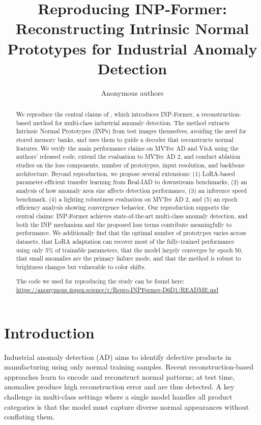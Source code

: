 \documentclass[10pt]{article} %
\title{Reproducing INP-Former: Reconstructing Intrinsic Normal Prototypes for Industrial Anomaly Detection}
\author{\name Anonymous authors}
\begin{document}
\maketitle

\begin{abstract}
We reproduce the central claims of \citet{inp_former_2025}, which introduces INP-Former, a reconstruction-based method for multi-class industrial anomaly detection. The method extracts Intrinsic Normal Prototypes (INPs) from test images themselves, avoiding the need for stored memory banks, and uses them to guide a decoder that reconstructs normal features. We verify the main performance claims on MVTec AD and VisA using the authors' released code, extend the evaluation to MVTec AD 2, and conduct ablation studies on the loss components, number of prototypes, input resolution, and backbone architecture. Beyond reproduction, we propose several extensions: (1) LoRA-based parameter-efficient transfer learning from Real-IAD to downstream benchmarks, (2) an analysis of how anomaly area size affects detection performance, (3) an inference speed benchmark, (4) a lighting robustness evaluation on MVTec AD 2, and (5) an epoch efficiency analysis showing convergence behavior. Our reproduction supports the central claims: INP-Former achieves state-of-the-art multi-class anomaly detection, and both the INP mechanism and the proposed loss terms contribute meaningfully to performance. We additionally find that the optimal number of prototypes varies across datasets, that LoRA adaptation can recover most of the fully-trained performance using only 5\% of trainable parameters, that the model largely converges by epoch 50, that small anomalies are the primary failure mode, and that the method is robust to brightness changes but vulnerable to color shifts.

The code we used for reproducing the study can be found here: \url{https://anonymous.4open.science/r/Repro-INPFormer-D6D1/README.md}
\end{abstract}


\section{Introduction}
\label{sec:intro}

Industrial anomaly detection (AD) aims to identify defective products in manufacturing using only normal training samples. Recent reconstruction-based approaches learn to encode and reconstruct normal patterns; at test time, anomalies produce high reconstruction error and are thus detected. A key challenge in multi-class settings where a single model handles all product categories is that the model must capture diverse normal appearances without conflating them.
\end{document}

